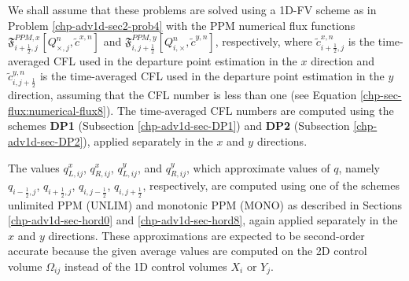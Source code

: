 We shall assume that these problems are solved using a 1D-FV scheme as in Problem \ref{chp-adv1d-sec2-prob4}
with the PPM numerical flux functions $\mathfrak{F}_{i+\frac{1}{2},j}^{PPM,x}[Q^n_{\times,j},\tilde{c}^{x,n}]$ and
$\mathfrak{F}_{i,j+\frac{1}{2}}^{PPM,y}[Q^n_{i,\times},\tilde{c}^{y,n}]$, respectively,
where $\tilde{c}^{x,n}_{i+\frac{1}{2},j}$ is the time-averaged CFL used in the departure point estimation in the $x$ direction
and $\tilde{c}^{y,n}_{i,j+\frac{1}{2}}$ is the time-averaged CFL used in the departure point estimation in the $y$ direction,
assuming that the CFL number is less than one (see Equation \eqref{chp-sec-flux:numerical-flux8}).
The time-averaged CFL numbers are computed using the schemes 
\textbf{DP1} (Subsection \ref{chp-adv1d-sec-DP1}) and \textbf{DP2}
(Subsection \ref{chp-adv1d-sec-DP2}), applied separately in the $x$ and $y$ directions.

The values $q_{L,ij}^x$, $q_{R,ij}^x$, $q_{L,ij}^y$, and $q_{R,ij}^y$,
which approximate values of $q$, namely 
$q_{i-\frac{1}{2},j}$, $q_{i+\frac{1}{2},j}$, $q_{i,j-\frac{1}{2}}$, $q_{i,j+\frac{1}{2}}$, respectively,
are computed using one of the schemes unlimited PPM (UNLIM) and monotonic PPM (MONO) as described
in Sections \ref{chp-adv1d-sec-hord0} and \ref{chp-adv1d-sec-hord8}, again
applied separately in the $x$ and $y$ directions.
These approximations are expected to be
second-order accurate because the given average values are computed on the
2D control volume $\Omega_{ij}$ instead of the 1D control volumes $X_i$ or $Y_j$.

